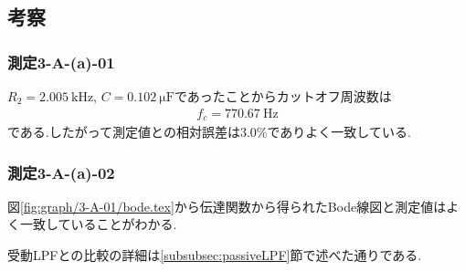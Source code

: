 \subsection{考察}
\subsubsection{測定3-A-(a)-01}
$R_2=2.005\ \si{\kilo\hertz}$, $C=0.102\ \si{\micro\farad}$であったことからカットオフ周波数は
\begin{align}
  f_c=770.67\ \si{\hertz}
\end{align}
である.したがって測定値との相対誤差は$3.0\%$でありよく一致している.
\subsubsection{測定3-A-(a)-02}
図\ref{fig:graph/3-A-01/bode.tex}から伝達関数から得られたBode線図と測定値はよく一致していることがわかる.

受動LPFとの比較の詳細は\ref{subsubsec:passiveLPF}節で述べた通りである.
